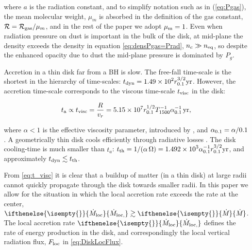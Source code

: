 \documentclass[12pt,english,preprint]{aastex}
\newcommand{\su}[2]{#1_{\rm #2}}
\newcommand{\mdt}[1][]{ 
  \ifthenelse{\isempty{#1}}
  {\dot{M}_{\rm loc}}
  { {\dot M}_{\rm{loc},{#1}} } 
  } %
\newcommand{\Mdt}[1][]{ 
    \ifthenelse{\isempty{#1}}
    {\dot{M}_{}}
    { {\dot M}_{{#1}} } 
} %
\begin{document}
\noindent where $a$ is the radiation constant, and to simplify notation such as in (\ref{eq:Pgas}), the mean molecular weight,
$\mu_m$ is absorbed in the definition of the gas constant,
${\cal R}=\su{{\cal R}}{gas}/\mu_m$, and in the rest of the
paper we adopt $\mu_{{\rm m}}=1$.  Even when radiation pressure on dust is important in the bulk of the disk, at mid-plane the density exceeds the density in equation \ref{eq:densPgas=Prad}, 
$n_c\gg \su{n}{eq}$,  so despite the enhanced opacity due to dust the mid-plane pressure is dominated by $P_{g}$.



Accretion in a thin disk far  from
a BH is slow. The free-fall time-scale is the shortest in the hierarchy of time-scales: 
$\displaystyle t_{{\rm dyn}}=1.49\times10^{2}r_{0.1}^{3/2}{\rm yr}$. 
However, the accretion time-scale corresponds to the viscous time-scale $t_{{\rm visc}}$ in the disk:

\begin{equation}
  t_{{\rm a}}\propto t_{{\rm visc}}=\frac{R}{v_{r}}=
  5.15\times10^{7}r_{0.1}^{1/2}T_{1500}^{-1}\alpha_{0.1}^{-1}\,\text{yr},\label{eq:t_visc}
\end{equation}

\noindent where $\alpha<1$ is the effective viscosity parameter, introduced
by \cite{ShakuraDiskModelGasAccretionRelativistic1972},
and $\su{\alpha}{0.1} = \alpha/0.1$. 
A geometrically thin disk cools efficiently through
radiative losses . The disk cooling-time is much smaller
than $t_{a}$: 
$\displaystyle t_{{\rm th}}=1/(\alpha\,\Omega)=1.492\times10^{3}\alpha_{0.1}^{-1}r_{0.1}^{3/2}{\rm yr}$,
and approximately $\su{t}{dyn}\lesssim \su{t}{th}$.

From \eqref{eq:t_visc} it is clear that a buildup of matter (in a thin disk) at large radii 
cannot quickly propagate through the disk towards smaller radii. 
In this paper we allow for the situation in which the local accretion rate exceeds the rate at the center, $\mdt\gtrsim\Mdt$. 
The local accretion rate $\mdt$ defines the rate of energy production in the disk, and 
correspondingly the local vertical radiation flux, $\su{F}{loc}$ in \eqref{eq:DiskLocFlux}.



\end{document}
